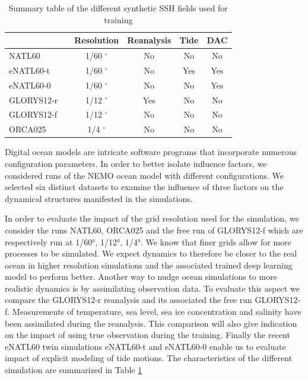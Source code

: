 \documentclass[draft]{agujournal2019}
\begin{document}
\begin{table}[h]

\begin{tabular}{ll||cccc}
\toprule
{} & {}& Resolution & Reanalysis & Tide & DAC  \\
\midrule
NATL60 &\cite{ajayiSpatialTemporalVariability2020}               &      1/60 $^\circ$ &               No &            No &                   No  \\
eNATL60-t &\cite{brodeauOceannextENATL60Material2020}         &      1/60 $^\circ$ &               No &           Yes &                  Yes  \\
eNATL60-0 &\cite{brodeauOceannextENATL60Material2020}         &      1/60 $^\circ$ &               No &            No &                  Yes  \\
GLORYS12-r &\cite{jean-michelCopernicusGlobal122021} &      1/12 $^\circ$ &              Yes &            No &                   No  \\
GLORYS12-f &\cite{jean-michelCopernicusGlobal122021}   &      1/12 $^\circ$ &               No &            No &                   No  \\
ORCA025& \cite{bernardImpactPartialSteps2006}             &       1/4 $^\circ$ &               No &            No &                   No  \\
\bottomrule
\end{tabular}
\caption{Summary table of the different synthetic SSH fields used for training}
\label{tab:data}
\end{table}



Digital ocean models are intricate software programs that incorporate numerous configuration parameters. In order to better isolate influence factors, we considered runs of the NEMO\cite{gurvanNEMOOceanEngine2022} ocean model with different configurations. We selected six distinct datasets to examine the influence of three factors on the dynamical structures manifested in the simulations.

In order to evaluate the impact of the grid resolution used for the simulation, we consider the runs NATL60, ORCA025 and the free run of GLORYS12-f  which are respectively run at  1/60°, 1/12°, 1/4°. We know that finer grids allow for more processes to be simulated. We expect dynamics to therefore be closer to the real ocean in higher resolution simulations and the associated trained deep learning model to perform better.
Another way to nudge ocean simulations to more realistic dynamics is by assimilating observation data. To evaluate this aspect we compare the GLORYS12-r reanalysis and its associated the free run GLORYS12-f. Measurements of temperature, sea level, sea ice concentration and salinity have been assimilated during the reanalysis. This comparison will also give indication on the impact of using true observation during the training.
Finally the recent eNATL60 twin simulations  eNATL60-t and eNATL60-0 enable us to evaluate impact of explicit modeling of tide motions.
The characteristics of the different simulation are summarized in Table \ref{tab:data}
\end{document}
